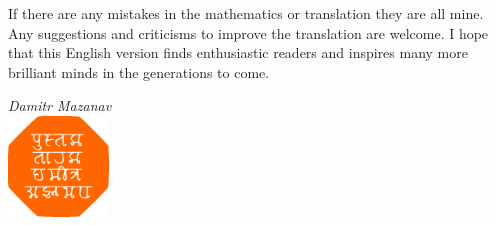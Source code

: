 If there are any mistakes in the mathematics or translation they are all mine. Any suggestions and criticisms to improve the translation are welcome. I hope that this English version finds enthusiastic readers and inspires many more brilliant minds in the generations to come.

\begin{flushright}
\emph{Damitr Mazanav}\\[5pt]
\includegraphics[width=0.2\textwidth]{figures/pustaktarak.pdf}
\end{flushright}
